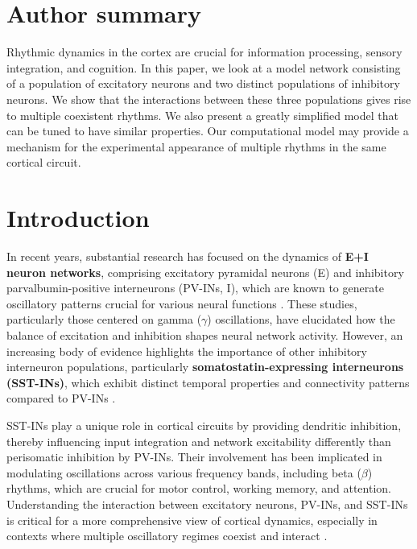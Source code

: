 \documentclass[10pt,letterpaper]{article}
\begin{document}
\section*{Author summary}
Rhythmic dynamics in the cortex are crucial for information processing, sensory integration, and cognition. In this paper, we look at a model  network consisting of a population of excitatory neurons and two distinct populations of inhibitory neurons. We show that the interactions between these three populations gives rise to multiple coexistent rhythms. We also present a greatly simplified model that can be tuned to have similar properties.  Our computational model may provide a mechanism for  the experimental appearance of multiple rhythms in the same cortical circuit.   


\linenumbers

\section*{Introduction}

In recent years, substantial research has focused on the dynamics of \textbf{E+I neuron networks}, comprising excitatory pyramidal neurons (E) and inhibitory parvalbumin-positive interneurons (PV-INs, I), which are known to generate oscillatory patterns crucial for various neural functions  \cite{GX2014Gamma, yi, mi}. These studies, particularly those centered on gamma ($\gamma$) oscillations, have elucidated how the balance of excitation and inhibition shapes neural network activity. However, an increasing body of evidence highlights the importance of other inhibitory interneuron populations, particularly \textbf{somatostatin-expressing interneurons (SST-INs)}, which exhibit distinct temporal properties and connectivity patterns compared to PV-INs \cite{chen2017somatostatin, yc, onorato2025gamma}.

SST-INs play a unique role in cortical circuits by providing dendritic inhibition, thereby influencing input integration and network excitability differently than perisomatic inhibition by PV-INs. Their involvement has been implicated in modulating oscillations across various frequency bands, including beta ($\beta$) rhythms, which are crucial for motor control, working memory, and attention. Understanding the interaction between excitatory neurons, PV-INs, and SST-INs is critical for a more comprehensive view of cortical dynamics, especially in contexts where multiple oscillatory regimes coexist and interact \cite{chen2017somatostatin,br,ABV}.
\end{document}
